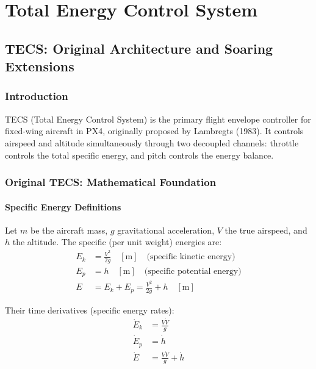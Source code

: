 \documentclass[12pt,a4paper]{report}
\begin{document}
\part{Total Energy Control System}

\chapter{TECS: Original Architecture and Soaring Extensions}

\section{Introduction}

TECS (Total Energy Control System) is the primary flight envelope controller
for fixed-wing aircraft in PX4, originally proposed by Lambregts (1983).
It controls airspeed and altitude simultaneously through two decoupled
channels: throttle controls the total specific energy, and pitch controls
the energy balance.

\section{Original TECS: Mathematical Foundation}

\subsection{Specific Energy Definitions}

Let $m$ be the aircraft mass, $g$ gravitational acceleration, $V$ the true
airspeed, and $h$ the altitude. The specific (per unit weight) energies are:
\begin{align}
  E_k &= \frac{V^2}{2g} \quad [\text{m}]
         \quad\text{(specific kinetic energy)} \\
  E_p &= h \quad [\text{m}]
         \quad\text{(specific potential energy)} \\
  E   &= E_k + E_p = \frac{V^2}{2g} + h \quad [\text{m}]
\end{align}

Their time derivatives (specific energy rates):
\begin{align}
  \dot{E}_k &= \frac{V\dot{V}}{g} \\
  \dot{E}_p &= \dot{h} \\
  \dot{E}   &= \frac{V\dot{V}}{g} + \dot{h}
\end{align}
\end{document}
